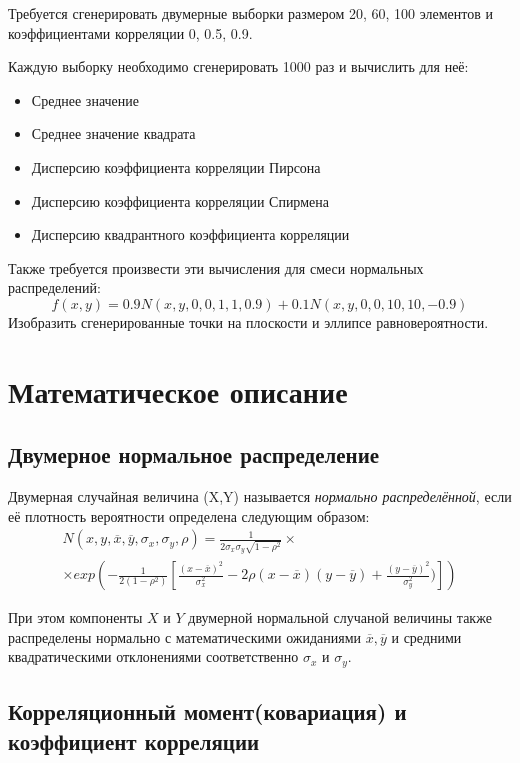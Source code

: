 \documentclass[12pt]{article}
\begin{document}
Требуется сгенерировать двумерные выборки размером 20, 60, 100 элементов и коэффициентами корреляции 0, 0.5, 0.9.

Каждую выборку необходимо сгенерировать 1000 раз и вычислить для неё:
\begin{itemize}
	\item Среднее значение
	\item Среднее значение квадрата
	\item Дисперсию коэффициента корреляции Пирсона
	\item Дисперсию коэффициента корреляции Спирмена
	\item Дисперсию квадрантного коэффициента корреляции
\end{itemize}

Также требуется произвести эти вычисления для смеси нормальных распределений:
\begin{equation}\label{mix}
f(x, y) = 0.9N(x, y, 0, 0, 1, 1, 0.9) + 0.1N(x, y, 0, 0, 10, 10, -0.9)
\end{equation}
Изобразить сгенерированные точки на плоскости и эллипсе равновероятности.
\newpage
\section{Математическое описание}
\subsection{Двумерное нормальное распределение}

Двумерная случайная величина (X,Y) называется {\it нормально распределённой}, если её плотность вероятности определена следующим образом:
\begin{multline}\label{N2}
	N(x, y, \overline{x}, \overline{y}, \sigma_x, \sigma_y, \rho) =
	\frac{1}{2 \sigma_x \sigma_y \sqrt{1 - \rho^2}} \times \\	
	\times exp \left( - \frac{1}{2(1 - \rho^2)} \left[ \frac{(x - \overline{x})^2}{\sigma_x^2} - 2 \rho (x - \overline{x}) (y - \overline{y}) + \frac{(y - \overline{y})^2}{\sigma_y^2}) \right] \right) 
\end{multline}

При этом компоненты $X$ и $Y$ двумерной нормальной случаной величины также распределены нормально с математическими ожиданиями $\overline{x}, \overline{y}$  и средними квадратическими отклонениями соответственно $\sigma_x$ и $\sigma_y$. \cite{lit1}

\subsection{Корреляционный момент(ковариация) и коэффициент корреляции}
\end{document}
